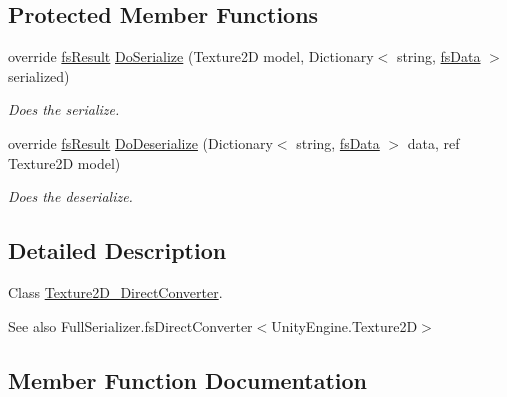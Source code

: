 \subsection*{Protected Member Functions}
\begin{DoxyCompactItemize}
\item 
override \hyperlink{struct_full_serializer_1_1fs_result}{fs\+Result} \hyperlink{class_full_serializer_1_1_internal_1_1_direct_converters_1_1_texture2_d___direct_converter_a590e355b26ac0221c95ef6475b5b16f6}{Do\+Serialize} (Texture2D model, Dictionary$<$ string, \hyperlink{class_full_serializer_1_1fs_data}{fs\+Data} $>$ serialized)
\begin{DoxyCompactList}\small\item\em Does the serialize. \end{DoxyCompactList}\item 
override \hyperlink{struct_full_serializer_1_1fs_result}{fs\+Result} \hyperlink{class_full_serializer_1_1_internal_1_1_direct_converters_1_1_texture2_d___direct_converter_ad806f06e5841f395ac5ab613255d8db4}{Do\+Deserialize} (Dictionary$<$ string, \hyperlink{class_full_serializer_1_1fs_data}{fs\+Data} $>$ data, ref Texture2D model)
\begin{DoxyCompactList}\small\item\em Does the deserialize. \end{DoxyCompactList}\end{DoxyCompactItemize}


\subsection{Detailed Description}
Class \hyperlink{class_full_serializer_1_1_internal_1_1_direct_converters_1_1_texture2_d___direct_converter}{Texture2\+D\+\_\+\+Direct\+Converter}. 

\begin{DoxySeeAlso}{See also}
Full\+Serializer.\+fs\+Direct\+Converter$<$\+Unity\+Engine.\+Texture2\+D$>$


\end{DoxySeeAlso}


\subsection{Member Function Documentation}
\mbox{\label{class_full_serializer_1_1_internal_1_1_direct_converters_1_1_texture2_d___direct_converter_aa8e980d9c61e0de1f8b49fd8075d701b}} 
